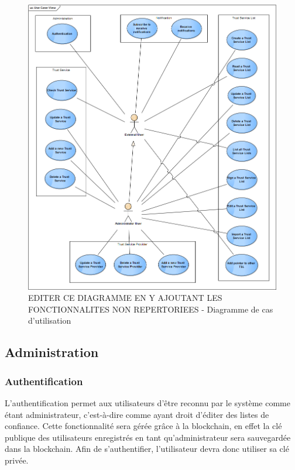 \documentclass{tnreport}
\begin{document}
\begin{figure}[h]
	\centering
	\includegraphics[scale=0.55]{figures/use-case-diagram}
	\caption{EDITER CE DIAGRAMME EN Y AJOUTANT LES FONCTIONNALITES NON REPERTORIEES - Diagramme de cas d'utilisation \cite{design-document}}
	\label{fig:use-case-diagram}
\end{figure}
\clearpage

\subsection{Administration}
\subsubsection{Authentification}
L'authentification permet aux utilisateurs d'être reconnu par le système comme étant administrateur, c'est-à-dire comme ayant droit d'éditer des listes de confiance. Cette fonctionnalité sera gérée grâce à la blockchain, en effet la clé publique des utilisateurs enregistrés en tant qu'administrateur sera sauvegardée dans la blockchain. Afin de s'authentifier, l'utilisateur devra donc utiliser sa clé privée.
\end{document}
